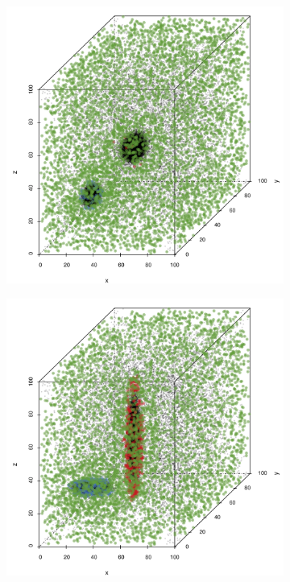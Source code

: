 		\begin{figure}
			\centering
			\begin{subfigure}{0.23\textwidth}
				\centering
				\includegraphics[keepaspectratio=true, width=\textwidth, height=0.23\textheight]{discussion/img/ferdosi_2_60000_anisotropy.png}
				\caption{}
				\label{fig:discussion:anisotropy:ferdosi2}
			\end{subfigure}
			\begin{subfigure}{0.23\textwidth}
				\centering
				\includegraphics[keepaspectratio=true, width=\textwidth, height=0.23\textheight]{discussion/img/baakman_2_60000_anisotropy.png}

\end{subfigure}
\end{figure}
